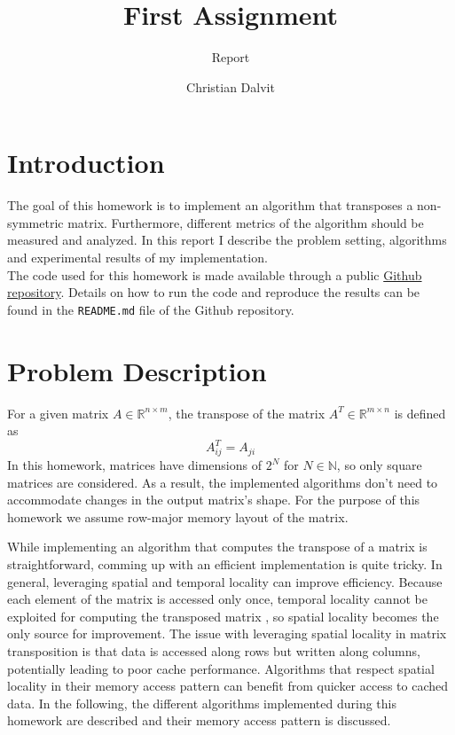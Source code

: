 \documentclass{scrartcl}
\title{First Assignment}
\subtitle{Report}
\author{Christian Dalvit}
\begin{document}
    \maketitle
    \section{Introduction}    
    The goal of this homework is to implement an algorithm that transposes a non-symmetric matrix. Furthermore, different metrics of the algorithm should be measured and analyzed. In this report I describe the problem setting, algorithms and experimental results of my implementation.\\
    The code used for this homework is made available through a public \href{https://github.com/chrisdalvit/matrix-transpose-benchmark}{Github repository}. Details on how to run the code and reproduce the results can be found in the \texttt{README.md} file of the Github repository.

    \section{Problem Description}
    For a given matrix $A \in \mathbb{R}^{n \times m}$, the transpose of the matrix $A^T \in \mathbb{R}^{m \times n}$ is defined as
    $$
        A^T_{ij} = A_{ji}
    $$
    In this homework, matrices have dimensions of $2^N$ for $N \in \mathbb{N}$, so only square matrices are considered. As a result, the implemented algorithms don't need to accommodate changes in the output matrix's shape. For the purpose of this homework we assume row-major memory layout of the matrix.

    While implementing an algorithm that computes the transpose of a matrix is straightforward, comming up with an efficient implementation is quite tricky. In general, leveraging spatial and temporal locality can improve efficiency. Because each element of the matrix is accessed only once, temporal locality cannot be exploited for computing the transposed matrix \cite{chatterjee2000cache}, so spatial locality becomes the only source for improvement. The issue with leveraging spatial locality in matrix transposition is that data is accessed along rows but written along columns, potentially leading to poor cache performance. Algorithms that respect spatial locality in their memory access pattern can benefit from quicker access to cached data. In the following, the different algorithms implemented during this homework are described and their memory access pattern is discussed.
\end{document}
